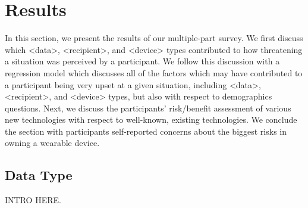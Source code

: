 \documentclass{acm_proc_article-sp}
\begin{document}

\section{Results}


In this section, we present the results of our multiple-part survey. We first discuss which <data>, <recipient>, and <device> types contributed to how threatening a situation was perceived by a participant. We follow this discussion with a regression model which discusses all of the factors which may have contributed to a participant being very upset at a given situation, including <data>, <recipient>, and <device> types, but also with respect to demographics questions. Next, we discuss the participants' risk/benefit assessment of various new technologies with respect to well-known, existing technologies. We conclude the section with participants self-reported concerns about the biggest risks in owning a wearable device.  

\subsection{Data Type}
INTRO HERE. 
\end{document}
